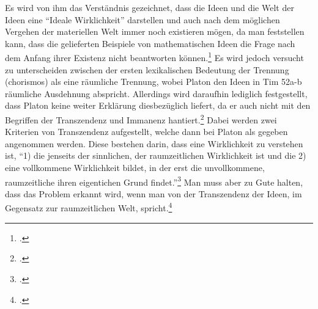 
Es wird von ihm das Verständnis gezeichnet, dass die Ideen und die Welt der Ideen eine \enquote{Ideale Wirklichkeit} darstellen und auch nach dem möglichen Vergehen der materiellen Welt immer noch existieren mögen, da man feststellen kann, dass die gelieferten Beispiele von mathematischen Ideen die Frage nach dem Anfang ihrer Existenz nicht beantworten können.\footcite[vgl.][S. 99]{Hirschberger} 
Es wird jedoch versucht zu unterscheiden zwischen der ersten lexikalischen Bedeutung der Trennung (chorismos) als eine räumliche Trennung, wobei Platon den Ideen in Tim 52a-b räumliche Ausdehnung abspricht. Allerdings wird daraufhin lediglich festgestellt, dass Platon keine weiter Erklärung diesbezüglich liefert, da er auch nicht mit den Begriffen der Transzendenz und Immanenz hantiert.\footcite[vgl.][S. 34f]{DisseMetaphysik} Dabei werden zwei Kriterien von Transzendenz aufgestellt, welche dann bei Platon als gegeben angenommen werden. Diese bestehen darin, dass eine Wirklichkeit zu verstehen ist, \enquote{1) die jenseits der sinnlichen, der raumzeitlichen Wirklichkeit ist und die 2) eine vollkommene Wirklichkeit bildet, in der erst die unvollkommene, raumzeitliche ihren eigentichen Grund findet.}\footcite[][S. 35]{DisseMetaphysik} Man muss aber zu Gute halten, dass das Problem erkannt wird, wenn man von der Transzendenz der Ideen, im Gegensatz zur raumzeitlichen Welt, spricht.\footcite[vgl.][S. 35]{DisseMetaphysik} 
